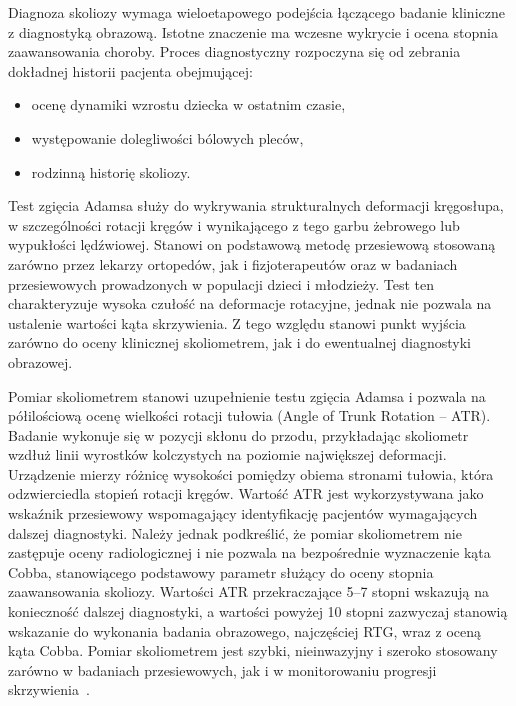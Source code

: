 Diagnoza skoliozy wymaga wieloetapowego podejścia łączącego badanie kliniczne z diagnostyką obrazową.
Istotne znaczenie ma wczesne wykrycie i ocena stopnia zaawansowania choroby.
Proces diagnostyczny rozpoczyna się od zebrania dokładnej historii pacjenta obejmującej:
\begin{itemize}
    \item ocenę dynamiki wzrostu dziecka w ostatnim czasie,
    \item występowanie dolegliwości bólowych pleców,
    \item rodzinną historię skoliozy.
\end{itemize}

Test zgięcia Adamsa służy do wykrywania strukturalnych deformacji kręgosłupa, w szczególności rotacji kręgów i wynikającego z tego garbu żebrowego lub wypukłości lędźwiowej.
Stanowi on podstawową metodę przesiewową stosowaną zarówno przez lekarzy ortopedów, jak i fizjoterapeutów oraz w badaniach przesiewowych prowadzonych w populacji dzieci i młodzieży.
Test ten charakteryzuje wysoka czułość na deformacje rotacyjne, jednak nie pozwala na ustalenie wartości kąta skrzywienia.
Z tego względu stanowi punkt wyjścia zarówno do oceny klinicznej skoliometrem, jak i do ewentualnej diagnostyki obrazowej.

Pomiar  skoliometrem stanowi uzupełnienie testu zgięcia Adamsa i pozwala na półilościową ocenę wielkości rotacji tułowia (Angle of Trunk Rotation – ATR).
Badanie wykonuje się w pozycji skłonu do przodu, przykładając skoliometr wzdłuż linii wyrostków kolczystych na poziomie największej deformacji. Urządzenie mierzy różnicę wysokości pomiędzy obiema stronami tułowia, która odzwierciedla stopień rotacji kręgów.
Wartość ATR jest wykorzystywana jako wskaźnik przesiewowy wspomagający identyfikację pacjentów wymagających dalszej diagnostyki. Należy jednak podkreślić, że pomiar skoliometrem nie zastępuje oceny radiologicznej i nie pozwala na bezpośrednie wyznaczenie kąta Cobba, stanowiącego podstawowy parametr służący do oceny stopnia zaawansowania skoliozy.
Wartości ATR przekraczające 5–7 stopni wskazują na konieczność dalszej diagnostyki, a wartości powyżej 10 stopni zazwyczaj stanowią wskazanie do wykonania badania obrazowego, najczęściej RTG, wraz z oceną kąta Cobba.
Pomiar skoliometrem jest szybki, nieinwazyjny i szeroko stosowany zarówno w badaniach przesiewowych, jak i w monitorowaniu progresji skrzywienia~\cite{czaprow}.

